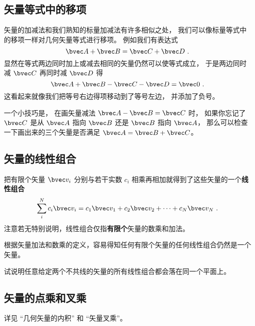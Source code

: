 \subsection{矢量等式中的移项}
矢量的加减法和我们熟知的标量加减法有许多相似之处， 我们可以像标量等式中的移项一样对几何矢量等式进行移项。 例如我们有表达式
\begin{equation}
\bvec A + \bvec B = \bvec C + \bvec D~.
\end{equation}
显然在等式两边同时加上或减去相同的矢量仍然可以使等式成立， 于是两边同时减 $\bvec C$ 再同时减 $\bvec D$ 得
\begin{equation}
\bvec A + \bvec B - \bvec C - \bvec D = \bvec 0~.
\end{equation}
这看起来就像我们把等号右边得项移动到了等号左边， 并添加了负号。

一个小技巧是， 在画矢量减法 $\bvec A - \bvec B = \bvec C$ 时， 如果你忘记了 $\bvec C$ 是从 $\bvec A$ 指向 $\bvec B$ 还是 $\bvec B$ 指向 $\bvec A$， 那么可以检查一下画出来的三个矢量是否满足 $\bvec A = \bvec B + \bvec C$。


\subsection{矢量的线性组合}
把有限个矢量 $\bvec v_i$ 分别与若干实数 $c_i$ 相乘再相加就得到了这些矢量的一个\textbf{线性组合}
\begin{equation}\label{eq_GVecOp_1}
\sum_i^N c_i \bvec v_i = c_1\bvec v_1 + c_2\bvec v_2 +\dots +c_N \bvec v_N~.
\end{equation}
注意若无特别说明，线性组合仅指\textbf{有限个}矢量的数乘和加法。

根据矢量加法和数乘的定义，容易得知任何有限个矢量的任何线性组合仍然是一个矢量。

\begin{exercise}{}
试说明任意给定两个不共线的矢量的所有线性组合都会落在同一个平面上。
\end{exercise}

\subsection{矢量的点乘和叉乘}
详见 “几何矢量的内积” 和 “矢量叉乘”。
